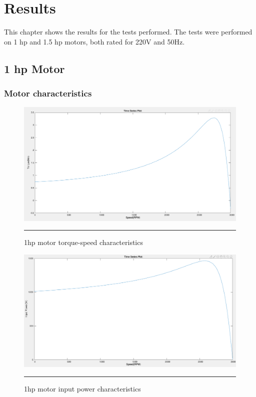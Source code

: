 \chapter{Results} %
\label{Chapter5}

This chapter shows the results for the tests performed. The tests were performed on 1 hp and 1.5 hp motors, both rated for 220V and 50Hz.

\clearpage
\section{1 hp Motor}
\subsection{Motor characteristics}

\begin{figure}[hbtp!]
	\centering
		\includegraphics[width = 4.5in]{./Figures/MS/fig51.png}
		\rule{35em}{0.5pt}
	\caption{1hp motor torque-speed characteristics}
	\label{fig:1hp motor torque-speed characteristics} 
\end{figure}

\begin{figure}[hbtp!]
	\centering
		\includegraphics[width = 4.5in]{./Figures/MS/fig52.png}
		\rule{35em}{0.5pt}
	\caption{1hp motor input power characteristics}
	\label{fig:1hp motor input power characteristics} 
\end{figure}

